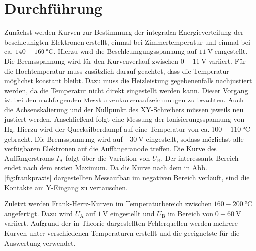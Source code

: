 
\section{Durchführung}
\label{sec:Durchführung}
Zunächst werden Kurven zur Bestimmung der integralen Energieverteilung der
beschleunigten Elektronen erstellt, einmal bei Zimmertemperatur und einmal bei
ca. $140- \SI{160}{\degreeCelsius}$. Hierzu wird die Beschleunigungsspannung auf
$\SI{11}{\volt}$ eingestellt. Die Bremsspannung wird für den Kurvenverlauf
zwischen $0 - \SI{11}{\volt}$ variiert. Für die Hochtemperatur muss zusätzlich
darauf geachtet, dass die Temperatur möglichst konstant bleibt. Dazu muss die
Heizleistung gegebenenfalls nachjustiert werden, da die Temperatur nicht direkt
eingestellt werden kann. Dieser Vorgang ist bei den nachfolgenden Messkurvenkurvenaufzeichnungen zu beachten.
Auch die Achsenskalierung und der Nullpunkt des XY-Schreibers müssen jeweils neu justiert werden.
Anschließend folgt eine Messung der Ionisierungsspannung von Hg. Hierzu wird der
Quecksilberdampf auf eine Temperatur von ca. $100- \SI{110}{\degreeCelsius}$ gebracht.
Die Bremsspannung wird auf $\SI{-30}{\volt}$ eingestellt, sodass möglichst alle
verfügbaren Elektronen auf die Auffängeranode treffen. Die Kurve des Auffängerstroms
$I_\text{A}$ folgt über die Variation von $U_\text{B}$. Der interessante Bereich endet
nach dem ersten Maximum. Da die Kurve nach dem in Abb. \ref{fig:frankpraxis}
dargestellten Messaufbau im negativen Bereich verläuft, sind die
Kontakte am Y-Eingang zu vertauschen.

Zuletzt werden Frank-Hertz-Kurven im Temperaturbereich zwischen $160-\SI{200}{\degreeCelsius}$
angefertigt. Dazu wird $U_\text{A}$ auf $\SI{1}{\volt}$ eingestellt und $U_\text{B}$
im Bereich von $0-\SI{60}{\volt}$ variiert. Aufgrund der in Theorie dargestellten
Fehlerquellen werden mehrere Kurven unter verschiedenen Temperaturen erstellt und
die geeignetste für die Auswertung verwendet.
